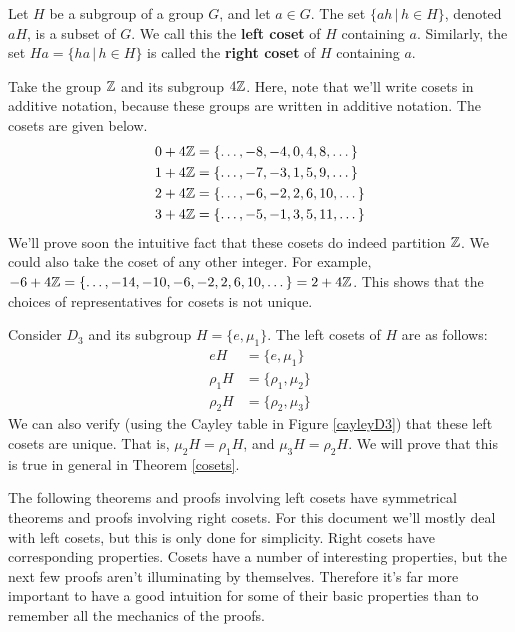 \begin{definition}
Let $H$ be a subgroup of a group $G$, and let $a \in G$. The set $\{ah \,|\, h \in H\}$, denoted $aH$, is a subset of $G$. We call this the \textbf{left coset} of $H$ containing $a$. Similarly, the set $Ha = \{ha \,|\, h \in H\}$ is called the \textbf{right coset} of $H$ containing $a$.
\end{definition}

\begin{example}
Take the group $\mathbb{Z}$ and its subgroup $4\mathbb{Z}$. Here, note that we'll write cosets in additive notation, because these groups are written in additive notation. The cosets are given below.
\begin{align*}
    0 + 4\mathbb{Z} &= \{\dots, -8, -4, 0, 4, 8, \dots\} \\
    1 + 4\mathbb{Z} &= \{\dots, -7, -3, 1, 5, 9, \dots\} \\
    2 + 4\mathbb{Z} &= \{\dots, -6, -2, 2, 6, 10, \dots\} \\
    3 + 4\mathbb{Z} &= \{\dots, -5, -1, 3, 5, 11, \dots\}
\end{align*}
We'll prove soon the intuitive fact that these cosets do indeed partition $\mathbb{Z}$. We could also take the coset of any other integer. For example, $-6 + 4\mathbb{Z} = \{\dots, -14, -10, -6, -2, 2, 6, 10, \dots\} = 2 + 4\mathbb{Z}$. This shows that the choices of representatives for cosets is not unique.
\end{example}

\begin{example}
Consider $D_3$ and its subgroup $H = \{e, \mu_1\}$. The left cosets of $H$ are as follows:
\begin{align*}
    eH      &= \{e, \mu_1\}      \\
    \rho_1H &= \{\rho_1, \mu_2\} \\
    \rho_2H &= \{\rho_2, \mu_3\}
\end{align*}
We can also verify (using the Cayley table in Figure \ref{cayleyD3}) that these left cosets are unique. That is, $\mu_2H = \rho_1H$, and $\mu_3H = \rho_2H$. We will prove that this is true in general in Theorem \ref{cosets}.
\end{example}

The following theorems and proofs involving left cosets have symmetrical theorems and proofs involving right cosets. For this document we'll mostly deal with left cosets, but this is only done for simplicity. Right cosets have corresponding properties. Cosets have a number of interesting properties, but the next few proofs  aren't illuminating by themselves. Therefore it's far more important to have a good intuition for some of their basic properties than to remember all the mechanics of the proofs.

